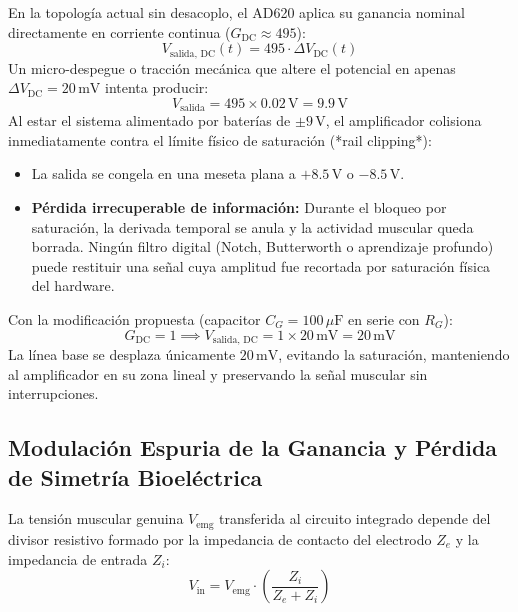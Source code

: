 \documentclass[11pt,a4paper]{article}
\begin{document}
En la topología actual sin desacoplo, el AD620 aplica su ganancia nominal directamente en corriente continua ($G_{\text{DC}} \approx 495$):
\begin{equation}
V_{\text{salida, DC}}(t) = 495 \cdot \Delta V_{\text{DC}}(t)
\end{equation}
Un micro-despegue o tracción mecánica que altere el potencial en apenas $\Delta V_{\text{DC}} = 20\,\text{mV}$ intenta producir:
\begin{equation}
V_{\text{salida}} = 495 \times 0.02\,\text{V} = 9.9\,\text{V}
\end{equation}
Al estar el sistema alimentado por baterías de $\pm 9\,\text{V}$, el amplificador colisiona inmediatamente contra el límite físico de saturación (*rail clipping*):
\begin{itemize}
    \item La salida se congela en una meseta plana a $+8.5\,\text{V}$ o $-8.5\,\text{V}$.
    \item \textbf{Pérdida irrecuperable de información:} Durante el bloqueo por saturación, la derivada temporal se anula y la actividad muscular queda borrada. Ningún filtro digital (Notch, Butterworth o aprendizaje profundo) puede restituir una señal cuya amplitud fue recortada por saturación física del hardware.
\end{itemize}

Con la modificación propuesta (capacitor $C_G = 100\,\mu\text{F}$ en serie con $R_G$):
\begin{equation}
G_{\text{DC}} = 1 \implies V_{\text{salida, DC}} = 1 \times 20\,\text{mV} = 20\,\text{mV}
\end{equation}
La línea base se desplaza únicamente $20\,\text{mV}$, evitando la saturación, manteniendo al amplificador en su zona lineal y preservando la señal muscular sin interrupciones.

\subsection{Modulación Espuria de la Ganancia y Pérdida de Simetría Bioeléctrica}
La tensión muscular genuina $V_{\text{emg}}$ transferida al circuito integrado depende del divisor resistivo formado por la impedancia de contacto del electrodo $Z_e$ y la impedancia de entrada $Z_i$:
\begin{equation}
V_{\text{in}} = V_{\text{emg}} \cdot \left( \frac{Z_i}{Z_e + Z_i} \right)
\end{equation}
\end{document}
